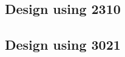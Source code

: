 \subsection{Design using 2310}


 \begin{center}




 \end{center}



\subsection{Design using 3021}


 \begin{center}




 \end{center}



